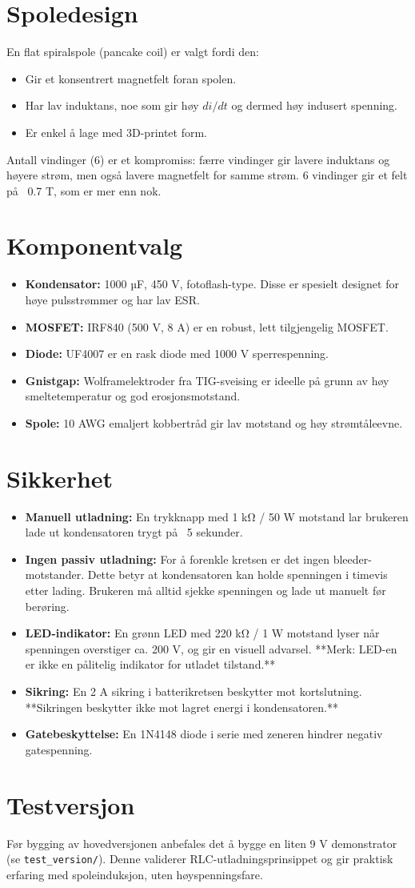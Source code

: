 \documentclass{article}
\begin{document}
\section{Spoledesign}
En flat spiralspole (pancake coil) er valgt fordi den:
\begin{itemize}
\item Gir et konsentrert magnetfelt foran spolen.
\item Har lav induktans, noe som gir høy $di/dt$ og dermed høy indusert spenning.
\item Er enkel å lage med 3D-printet form.
\end{itemize}
Antall vindinger (6) er et kompromiss: færre vindinger gir lavere induktans og høyere strøm, men også lavere magnetfelt for samme strøm. 6 vindinger gir et felt på ~0.7 T, som er mer enn nok.

\section{Komponentvalg}
\begin{itemize}
\item \textbf{Kondensator:} 1000 µF, 450 V, fotoflash-type. Disse er spesielt designet for høye pulsstrømmer og har lav ESR.
\item \textbf{MOSFET:} IRF840 (500 V, 8 A) er en robust, lett tilgjengelig MOSFET.
\item \textbf{Diode:} UF4007 er en rask diode med 1000 V sperrespenning.
\item \textbf{Gnistgap:} Wolframelektroder fra TIG-sveising er ideelle på grunn av høy smeltetemperatur og god erosjonsmotstand.
\item \textbf{Spole:} 10 AWG emaljert kobbertråd gir lav motstand og høy strømtåleevne.
\end{itemize}

\section{Sikkerhet}
\begin{itemize}
\item \textbf{Manuell utladning:} En trykknapp med 1 kΩ / 50 W motstand lar brukeren lade ut kondensatoren trygt på ~5 sekunder.
\item \textbf{Ingen passiv utladning:} For å forenkle kretsen er det ingen bleeder-motstander. Dette betyr at kondensatoren kan holde spenningen i timevis etter lading. Brukeren må alltid sjekke spenningen og lade ut manuelt før berøring.
\item \textbf{LED-indikator:} En grønn LED med 220 kΩ / 1 W motstand lyser når spenningen overstiger ca. 200 V, og gir en visuell advarsel. **Merk: LED-en er ikke en pålitelig indikator for utladet tilstand.**
\item \textbf{Sikring:} En 2 A sikring i batterikretsen beskytter mot kortslutning. **Sikringen beskytter ikke mot lagret energi i kondensatoren.**
\item \textbf{Gatebeskyttelse:} En 1N4148 diode i serie med zeneren hindrer negativ gatespenning.
\end{itemize}

\section{Testversjon}
Før bygging av hovedversjonen anbefales det å bygge en liten 9 V demonstrator (se \texttt{test\_version/}). Denne validerer RLC-utladningsprinsippet og gir praktisk erfaring med spoleinduksjon, uten høyspenningsfare.
\end{document}
